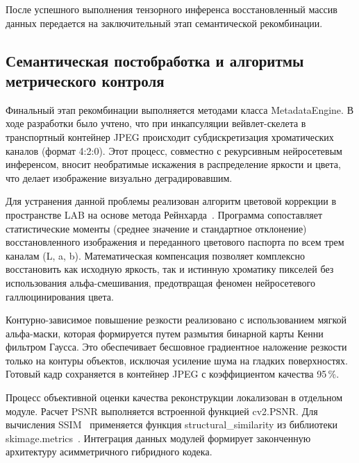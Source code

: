 После успешного выполнения тензорного инференса восстановленный массив данных передается на заключительный этап семантической рекомбинации.

\subsection[Семантическая постобработка и алгоритмы метрического\protect\\ контроля]{Семантическая постобработка и алгоритмы метрического контроля}

Финальный этап рекомбинации выполняется методами класса MetadataEngine. В ходе разработки было учтено, что при инкапсуляции вейвлет-скелета в транспортный контейнер JPEG происходит субдискретизация хроматических каналов (формат 4:2:0). Этот процесс, совместно с рекурсивным нейросетевым инференсом, вносит необратимые искажения в распределение яркости и цвета, что делает изображение визуально деградировавшим.

Для устранения данной проблемы реализован алгоритм цветовой коррекции в пространстве LAB на основе метода Рейнхарда~\cite{reinhard2001}. Программа сопоставляет статистические моменты (среднее значение и стандартное отклонение) восстановленного изображения и переданного цветового паспорта по всем трем каналам (L, a, b). Математическая компенсация позволяет комплексно восстановить как исходную яркость, так и истинную хроматику пикселей без использования альфа-смешивания, предотвращая феномен нейросетевого галлюцинирования цвета.

Контурно-зависимое повышение резкости реализовано с использованием мягкой альфа-маски, которая формируется путем размытия бинарной карты Кенни фильтром Гаусса. Это обеспечивает бесшовное градиентное наложение резкости только на контуры объектов, исключая усиление шума на гладких поверхностях. Готовый кадр сохраняется в контейнер JPEG с коэффициентом качества 95\,\%.

Процесс объективной оценки качества реконструкции локализован в отдельном модуле. Расчет PSNR выполняется встроенной функцией cv2.PSNR. Для вычисления SSIM~\cite{wang2004ssim} применяется функция structural\_similarity из библиотеки skimage.metrics~\cite{scikit-image}. Интеграция данных модулей формирует законченную архитектуру асимметричного гибридного кодека.